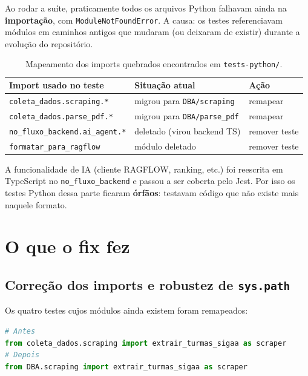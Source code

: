 \documentclass[11pt,a4paper]{article}
\begin{document}
Ao rodar a suíte, praticamente todos os arquivos Python falhavam ainda na
\textbf{importação}, com \texttt{ModuleNotFoundError}. A causa: os testes
referenciavam módulos em caminhos antigos que mudaram (ou deixaram de existir)
durante a evolução do repositório.

\begin{table}[h]
\centering
\small
\begin{tabular}{@{}lll@{}}
\toprule
\textbf{Import usado no teste} & \textbf{Situação atual} & \textbf{Ação} \\
\midrule
\texttt{coleta\_dados.scraping.*}        & migrou para \texttt{DBA/scraping}   & remapear \\
\texttt{coleta\_dados.parse\_pdf.*}      & migrou para \texttt{DBA/parse\_pdf} & remapear \\
\texttt{no\_fluxo\_backend.ai\_agent.*}  & deletado (virou backend TS)         & remover teste \\
\texttt{formatar\_para\_ragflow}         & módulo deletado                     & remover teste \\
\bottomrule
\end{tabular}
\caption{Mapeamento dos imports quebrados encontrados em \texttt{tests-python/}.}
\end{table}

A funcionalidade de IA (cliente RAGFLOW, ranking, etc.) foi reescrita em
TypeScript no \texttt{no\_fluxo\_backend} e passou a ser coberta pelo Jest.
Por isso os testes Python dessa parte ficaram \textbf{órfãos}: testavam código
que não existe mais naquele formato.

\section{O que o fix fez}

\subsection{Correção dos imports e robustez de \texttt{sys.path}}

Os quatro testes cujos módulos ainda existem foram remapeados:

\begin{lstlisting}[language=Python]
# Antes
from coleta_dados.scraping import extrair_turmas_sigaa as scraper
# Depois
from DBA.scraping import extrair_turmas_sigaa as scraper
\end{lstlisting}
\end{document}
